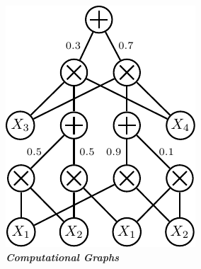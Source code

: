 \documentclass[xcolor={usenames,dvipsnames,svgnames}, compress]{beamer}
\newcommand{\cmark}{\ding{51}}%
\newcommand{\xmark}{\ding{55}}
\begin{document}
\begin{frame}[t]
\begin{center}
\begin{minipage}[t]{0.29\linewidth}
\begin{center}
      \end{center}
    \end{minipage}\hfill\begin{minipage}[t]{0.32\linewidth}
      \begin{center}
        \includegraphics[width=0.7\linewidth]{figures/spn}\\
        \textbf{\emph{Computational Graphs}}\\[20pt]
      \end{center}
    \end{minipage}\hfill\begin{minipage}[t]{0.29\linewidth}
      \begin{center}

\end{center}
\end{minipage}
\end{center}
\end{frame}
\end{document}
